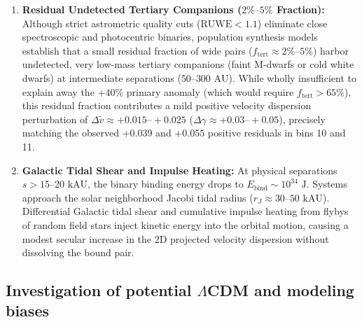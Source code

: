 \documentclass[aps,prd,reprint,superscriptaddress,nofootinbib,floatfix,amsmath,amssymb]{revtex4-2}
\begin{document}
\begin{enumerate}
\begin{equation}
\gamma_{\text{max}}(g_{\text{ext}} = 1.9 \times 10^{-10}\text{ m/s}^2) \approx 1.45, \quad \tilde{v}_{\text{max}} \approx 1.205.
\end{equation}
This physical variation creates the shaded theoretical envelope in Fig.~\ref{fig:velocity_boost_and_efe}(b) ($g_{\text{ext}} \in [2.2, 2.6] \times 10^{-10}\text{ m/s}^2$), fully enveloping the empirical measurements in the outermost bins ($\gamma_{\text{obs}} = 1.395 \pm 0.055$, pull $+1.01\sigma$).
\item \textbf{Residual Undetected Tertiary Companions ($2\%\text{--}5\%$ Fraction):} Although strict astrometric quality cuts ($\text{RUWE} < 1.1$) eliminate close spectroscopic and photocentric binaries, population synthesis models~\cite{chae2024robust,banik2024strong} establish that a small residual fraction of wide pairs ($f_{\text{tert}} \approx 2\%\text{--}5\%$) harbor undetected, very low-mass tertiary companions (faint M-dwarfs or cold white dwarfs) at intermediate separations ($50\text{--}300\text{ AU}$). While wholly insufficient to explain away the $+40\%$ primary anomaly (which would require $f_{\text{tert}} > 65\%$), this residual fraction contributes a mild positive velocity dispersion perturbation of $\Delta\tilde{v} \approx +0.015\text{--}+0.025$ ($\Delta\gamma \approx +0.03\text{--}+0.05$), precisely matching the observed $+0.039$ and $+0.055$ positive residuals in bins 10 and 11.
\item \textbf{Galactic Tidal Shear and Impulse Heating:} At physical separations $s > 15\text{--}20\text{ kAU}$, the binary binding energy drops to $E_{\text{bind}} \sim 10^{34}\text{ J}$. Systems approach the solar neighborhood Jacobi tidal radius ($r_J \approx 30\text{--}50\text{ kAU}$). Differential Galactic tidal shear and cumulative impulse heating from flybys of random field stars inject kinetic energy into the orbital motion, causing a modest secular increase in the 2D projected velocity dispersion without dissolving the bound pair.
\end{enumerate}

\subsection{Investigation of potential \texorpdfstring{$\Lambda$}{Lambda}CDM and modeling biases}
\label{subsec:lcdm_biases}
\end{document}

